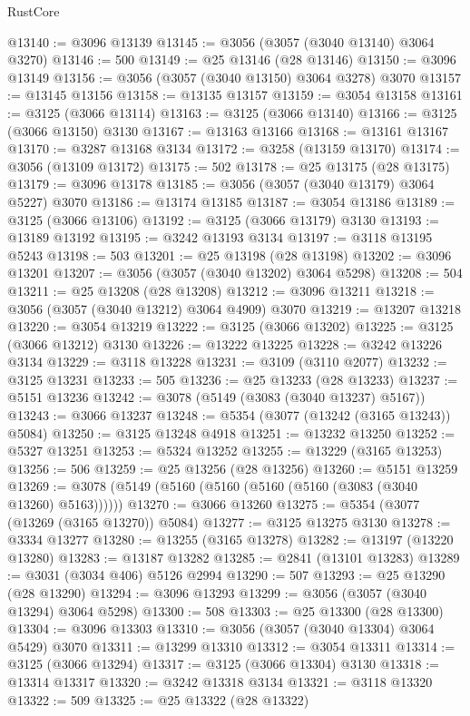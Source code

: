 \begin{lexlean}{RustCore}
\begin{coremodule}
@13140 := @3096 @13139
@13145 := @3056 (@3057 (@3040 @13140) @3064 @3270)
@13146 := 500
@13149 := @25 @13146 (@28 @13146)
@13150 := @3096 @13149
@13156 := @3056 (@3057 (@3040 @13150) @3064 @3278) @3070
@13157 := @13145 @13156
@13158 := @13135 @13157
@13159 := @3054 @13158
@13161 := @3125 (@3066 @13114)
@13163 := @3125 (@3066 @13140)
@13166 := @3125 (@3066 @13150) @3130
@13167 := @13163 @13166
@13168 := @13161 @13167
@13170 := @3287 @13168 @3134
@13172 := @3258 (@13159 @13170)
@13174 := @3056 (@13109 @13172)
@13175 := 502
@13178 := @25 @13175 (@28 @13175)
@13179 := @3096 @13178
@13185 := @3056 (@3057 (@3040 @13179) @3064 @5227) @3070
@13186 := @13174 @13185
@13187 := @3054 @13186
@13189 := @3125 (@3066 @13106)
@13192 := @3125 (@3066 @13179) @3130
@13193 := @13189 @13192
@13195 := @3242 @13193 @3134
@13197 := @3118 @13195 @5243
@13198 := 503
@13201 := @25 @13198 (@28 @13198)
@13202 := @3096 @13201
@13207 := @3056 (@3057 (@3040 @13202) @3064 @5298)
@13208 := 504
@13211 := @25 @13208 (@28 @13208)
@13212 := @3096 @13211
@13218 := @3056 (@3057 (@3040 @13212) @3064 @4909) @3070
@13219 := @13207 @13218
@13220 := @3054 @13219
@13222 := @3125 (@3066 @13202)
@13225 := @3125 (@3066 @13212) @3130
@13226 := @13222 @13225
@13228 := @3242 @13226 @3134
@13229 := @3118 @13228
@13231 := @3109 (@3110 @2077)
@13232 := @3125 @13231
@13233 := 505
@13236 := @25 @13233 (@28 @13233)
@13237 := @5151 @13236
@13242 := @3078 (@5149 (@3083 (@3040 @13237) @5167))
@13243 := @3066 @13237
@13248 := @5354 (@3077 (@13242 (@3165 @13243)) @5084)
@13250 := @3125 @13248 @4918
@13251 := @13232 @13250
@13252 := @5327 @13251
@13253 := @5324 @13252
@13255 := @13229 (@3165 @13253)
@13256 := 506
@13259 := @25 @13256 (@28 @13256)
@13260 := @5151 @13259
@13269 := @3078 (@5149 (@5160 (@5160 (@5160 (@5160 (@3083 (@3040 @13260) @5163))))))
@13270 := @3066 @13260
@13275 := @5354 (@3077 (@13269 (@3165 @13270)) @5084)
@13277 := @3125 @13275 @3130
@13278 := @3334 @13277
@13280 := @13255 (@3165 @13278)
@13282 := @13197 (@13220 @13280)
@13283 := @13187 @13282
@13285 := @2841 (@13101 @13283)
@13289 := @3031 (@3034 @406) @5126 @2994
@13290 := 507
@13293 := @25 @13290 (@28 @13290)
@13294 := @3096 @13293
@13299 := @3056 (@3057 (@3040 @13294) @3064 @5298)
@13300 := 508
@13303 := @25 @13300 (@28 @13300)
@13304 := @3096 @13303
@13310 := @3056 (@3057 (@3040 @13304) @3064 @5429) @3070
@13311 := @13299 @13310
@13312 := @3054 @13311
@13314 := @3125 (@3066 @13294)
@13317 := @3125 (@3066 @13304) @3130
@13318 := @13314 @13317
@13320 := @3242 @13318 @3134
@13321 := @3118 @13320
@13322 := 509
@13325 := @25 @13322 (@28 @13322)

\end{coremodule}
\end{lexlean}
